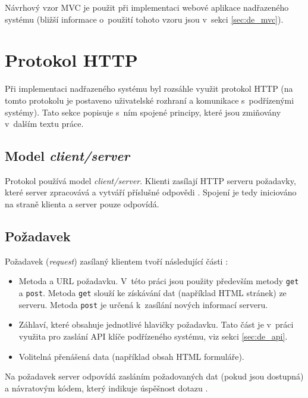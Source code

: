 Návrhový vzor MVC je použit při implementaci webové aplikace nadřazeného systému (bližší informace o~použití tohoto vzoru jsou v~sekci \ref{sec:de_mvc}).

\section{Protokol HTTP}

Při implementaci nadřazeného systému byl rozsáhle využit protokol HTTP (na tomto protokolu je postaveno uživatelské rozhraní a komunikace s~podřízenými systémy). Tato sekce popisuje s~ním spojené principy, které jsou zmiňovány v~dalším textu práce. 

\subsection{Model \textit{client/server}}

Protokol používá model \textit{client/server}. Klienti zasílají HTTP serveru požadavky, které server zpracovává a vytváří příslušné odpovědi \cite{tcp}. Spojení je tedy iniciováno na straně klienta a server pouze odpovídá. 

\subsection{Požadavek}

Požadavek (\textit{request}) zasílaný klientem tvoří následující části \cite{tcp}:

\begin{itemize}
    \item Metoda a URL požadavku. V~této práci jsou použity především metody \texttt{get} a \texttt{post}. Metoda \texttt{get} slouží ke získávání dat (například HTML stránek) ze serveru. Metoda \texttt{post} je určená k~zasílání nových informací serveru.
    \item Záhlaví, které obsahuje jednotlivé hlavičky požadavku. Tato část je v~práci využita pro zaslání API klíče podřízeného systému, viz sekci \ref{sec:de_api}.
    \item Volitelná přenášená data (například obsah HTML formuláře).
\end{itemize}

Na požadavek server odpovídá zasláním požadovaných dat (pokud jsou dostupná) a návratovým kódem, který indikuje úspěšnost dotazu \cite{tcp}.



